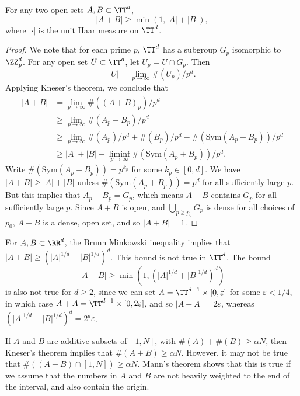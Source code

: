 \begin{theorem}
    For any two open sets $A,B \subset \TT^d$,
    \[ |A + B| \geq \min(1, |A| + |B|), \]
    where $| \cdot |$ is the unit Haar measure on $\TT^d$.
\end{theorem}
\begin{proof}
    We note that for each prime $p$, $\TT^d$ has a subgroup $G_p$ isomorphic to $\ZZ_p^d$. For any open set $U \subset \TT^d$, let $U_p = U \cap G_p$. Then
    \[ |U| = \lim_{p \to \infty} \#(U_p) / p^d. \]
    Applying Kneser's theorem, we conclude that
    \begin{align*}
        |A + B| &= \lim_{p \to \infty} \#((A + B)_p) / p^d\\
        &\geq \lim_{p \to \infty} \#(A_p + B_p)/ p^d\\
        &\geq \lim_{p \to \infty} \#(A_p)/p^d + \#(B_p)/p^d - \#(\text{Sym}(A_p + B_p))/p^d\\
        &\geq |A| + |B| - \liminf_{p \to \infty} \#(\text{Sym}(A_p + B_p)) / p^d.
    \end{align*}
    Write $\#(\text{Sym}(A_p + B_p)) = p^{k_p}$ for some $k_p \in [0,d]$. We have $|A + B| \geq |A| + |B|$ unless $\#(\text{Sym}(A_p + B_p)) = p^d$ for all sufficiently large $p$. But this implies that $A_p + B_p = G_p$, which means $A + B$ contains $G_p$ for all sufficiently large $p$. Since $A + B$ is open, and $\bigcup_{p \geq p_0} G_p$ is dense for all choices of $p_0$, $A + B$ is a dense, open set, and so $|A + B| = 1$.
\end{proof}

\begin{remark}
    For $A,B \subset \RR^d$, the Brunn Minkowski inequality implies that $|A + B| \geq (|A|^{1/d} + |B|^{1/d})^d$. This bound is not true in $\TT^d$. The bound
    \[ |A + B| \geq \min(1, (|A|^{1/d} + |B|^{1/d})^d) \]
    is also not true for $d \geq 2$, since we can set $A = \TT^{d-1} \times [0,\varepsilon]$ for some $\varepsilon < 1/4$, in which case $A + A = \TT^{d-1} \times [0,2\varepsilon]$, and so $|A + A| = 2\varepsilon$, whereas $(|A|^{1/d} + |B|^{1/d})^d = 2^d \varepsilon$.
\end{remark}

If $A$ and $B$ are additive subsets of $[1,N]$, with $\#(A) + \#(B) \geq \alpha N$, then Kneser's theorem implies that $\#(A + B) \geq \alpha N$. However, it may not be true that $\#((A + B) \cap [1,N]) \geq \alpha N$. Mann's theorem shows that this is true if we assume that the numbers in $A$ and $B$ are not heavily weighted to the end of the interval, and also contain the origin.

